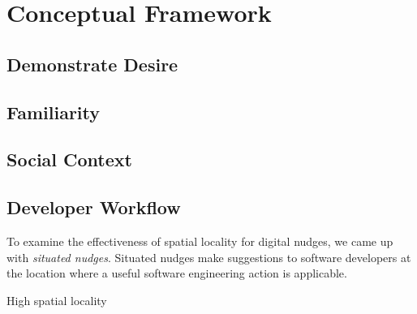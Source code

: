 \section{Conceptual Framework}

\subsection{Demonstrate Desire}

\subsection{Familiarity}

\subsection{Social Context}

\subsection{Developer Workflow}




To examine the effectiveness of spatial locality for digital nudges, we came up with \textit{situated nudges}. Situated nudges make suggestions to software developers at the location where a useful software engineering action is applicable.

High spatial locality


